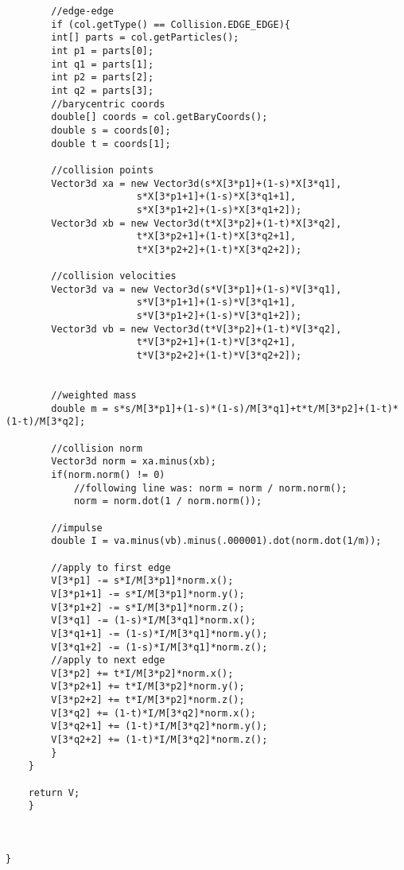 \begin{lstlisting}
	    //edge-edge
	    if (col.getType() == Collision.EDGE_EDGE){
		int[] parts = col.getParticles();
		int p1 = parts[0];
		int q1 = parts[1];
		int p2 = parts[2];
		int q2 = parts[3];
		//barycentric coords
		double[] coords = col.getBaryCoords();
		double s = coords[0];
		double t = coords[1];

		//collision points
		Vector3d xa = new Vector3d(s*X[3*p1]+(1-s)*X[3*q1],
					   s*X[3*p1+1]+(1-s)*X[3*q1+1],
					   s*X[3*p1+2]+(1-s)*X[3*q1+2]);
		Vector3d xb = new Vector3d(t*X[3*p2]+(1-t)*X[3*q2],
					   t*X[3*p2+1]+(1-t)*X[3*q2+1],
					   t*X[3*p2+2]+(1-t)*X[3*q2+2]);

		//collision velocities
		Vector3d va = new Vector3d(s*V[3*p1]+(1-s)*V[3*q1],
					   s*V[3*p1+1]+(1-s)*V[3*q1+1],
					   s*V[3*p1+2]+(1-s)*V[3*q1+2]);
		Vector3d vb = new Vector3d(t*V[3*p2]+(1-t)*V[3*q2],
					   t*V[3*p2+1]+(1-t)*V[3*q2+1],
					   t*V[3*p2+2]+(1-t)*V[3*q2+2]);

		
		//weighted mass
		double m = s*s/M[3*p1]+(1-s)*(1-s)/M[3*q1]+t*t/M[3*p2]+(1-t)*(1-t)/M[3*q2];
		
		//collision norm
		Vector3d norm = xa.minus(xb);
		if(norm.norm() != 0)
		    //following line was: norm = norm / norm.norm();
		    norm = norm.dot(1 / norm.norm());
		
		//impulse
		double I = va.minus(vb).minus(.000001).dot(norm.dot(1/m));
		
		//apply to first edge
		V[3*p1] -= s*I/M[3*p1]*norm.x();
		V[3*p1+1] -= s*I/M[3*p1]*norm.y();
		V[3*p1+2] -= s*I/M[3*p1]*norm.z();
		V[3*q1] -= (1-s)*I/M[3*q1]*norm.x();
		V[3*q1+1] -= (1-s)*I/M[3*q1]*norm.y();
		V[3*q1+2] -= (1-s)*I/M[3*q1]*norm.z();
		//apply to next edge
		V[3*p2] += t*I/M[3*p2]*norm.x();
		V[3*p2+1] += t*I/M[3*p2]*norm.y();
		V[3*p2+2] += t*I/M[3*p2]*norm.z();
		V[3*q2] += (1-t)*I/M[3*q2]*norm.x();
		V[3*q2+1] += (1-t)*I/M[3*q2]*norm.y();
		V[3*q2+2] += (1-t)*I/M[3*q2]*norm.z();
	    }
	}

	return V;
    }



}\end{lstlisting}

